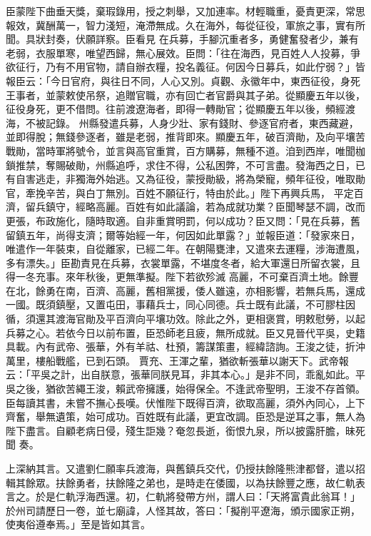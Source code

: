\begin{pinyinscope}
 臣蒙陛下曲垂天獎，棄瑕錄用，授之刺舉，又加連率。材輕職重，憂責更深，常思報效，冀酬萬一，智力淺短，淹滯無成。久在海外，每從征役，軍旅之事，實有所聞。具狀封奏，伏願詳察。臣看見
 在兵募，手腳沉重者多，勇健奮發者少，兼有老弱，衣服單寒，唯望西歸，無心展效。臣問：「往在海西，見百姓人人投募，爭欲征行，乃有不用官物，請自辦衣糧，投名義征。何因今日募兵，如此佇弱？」皆報臣云：「今日官府，與往日不同，人心又別。貞觀、永徽年中，東西征役，身死王事者，並蒙敕使吊祭，追贈官職，亦有回亡者官爵與其子弟。從顯慶五年以後，征役身死，更不借問。往前渡遼海者，即得一轉勛官；從顯慶五年以後，頻經渡海，不被記錄。
 州縣發遣兵募，人身少壯、家有錢財、參逐官府者，東西藏避，並即得脫；無錢參逐者，雖是老弱，推背即來。顯慶五年，破百濟勛，及向平壤苦戰勛，當時軍將號令，並言與高官重賞，百方購募，無種不道。洎到西岸，唯聞枷鎖推禁，奪賜破勛，州縣追呼，求住不得，公私困弊，不可言盡。發海西之日，已有自害逃走，非獨海外始逃。又為征役，蒙授勛級，將為榮寵，頻年征役，唯取勛官，牽挽辛苦，與白丁無別。百姓不願征行，特由於此。」陛下再興兵馬，
 平定百濟，留兵鎮守，經略高麗。百姓有如此議論，若為成就功業？臣聞琴瑟不調，改而更張，布政施化，隨時取適。自非重賞明罰，何以成功？臣又問：「見在兵募，舊留鎮五年，尚得支濟；爾等始經一年，何因如此單露？」並報臣道：「發家來日，唯遣作一年裝束，自從離家，已經二年。在朝陽甕津，又遣來去運糧，涉海遭風，多有漂失。」臣勘責見在兵募，衣裳單露，不堪度冬者，給大軍還日所留衣裳，且得一冬充事。來年秋後，更無準擬。陛下若欲殄滅
 高麗，不可棄百濟土地。餘豐在北，餘勇在南，百濟、高麗，舊相黨援，倭人雖遠，亦相影響，若無兵馬，還成一國。既須鎮壓，又置屯田，事藉兵士，同心同德。兵士既有此議，不可膠柱因循，須還其渡海官勛及平百濟向平壤功效。除此之外，更相褒賞，明敕慰勞，以起兵募之心。若依今日以前布置，臣恐師老且疲，無所成就。臣又見晉代平吳，史籍具載。內有武帝、張華，外有羊祜、杜預，籌謀策畫，經緯諮詢。王浚之徒，折沖萬里，樓船戰艦，已到石頭。
 賈充、王渾之輩，猶欲斬張華以謝天下。武帝報云：「平吳之計，出自朕意，張華同朕見耳，非其本心。」是非不同，乖亂如此。平吳之後，猶欲苦繩王浚，賴武帝擁護，始得保全。不逢武帝聖明，王浚不存首領。臣每讀其書，未嘗不撫心長嘆。伏惟陛下既得百濟，欲取高麗，須外內同心，上下齊奮，舉無遺策，始可成功。百姓既有此議，更宜改調。臣恐是逆耳之事，無人為陛下盡言。自顧老病日侵，殘生詎幾？奄忽長逝，銜恨九泉，所以披露肝膽，昧死聞
 奏。



 上深納其言。又遣劉仁願率兵渡海，與舊鎮兵交代，仍授扶餘隆熊津都督，遣以招輯其餘眾。扶餘勇者，扶餘隆之弟也，是時走在倭國，以為扶餘豐之應，故仁軌表言之。於是仁軌浮海西還。初，仁軌將發帶方州，謂人曰：「天將富貴此翁耳！」於州司請歷日一卷，並七廟諱，人怪其故，答曰：「擬削平遼海，頒示國家正朔，使夷俗遵奉焉。」至是皆如其言。




\end{pinyinscope}
